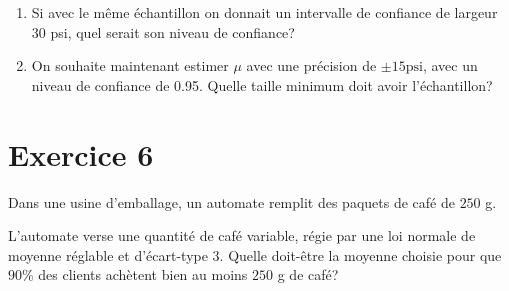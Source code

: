 \begin{enumerate}
{\begin{solution}
            Cet intervalle de confiance est plus large. Plus un intervalle est large, plus la probabilité de tomber à l'intérieur est grande.
            
        \end{solution}
    }{}
    \item Si avec le même échantillon on donnait un intervalle de confiance de largeur 30 psi, quel serait son niveau de confiance?

    \item On souhaite maintenant estimer $\mu$ avec une précision de $\pm 15 \mathrm{psi}$, avec un niveau de confiance de 0.95. Quelle taille minimum doit avoir l'échantillon?
\end{enumerate}

\vspace{0.8cm}

\section*{Exercice 6}
Dans une usine d'emballage, un automate remplit des paquets de café de $250$ g. 

L'automate verse une quantité de café variable, régie par une loi normale de moyenne réglable et d'écart-type $3$. 
Quelle doit-être la moyenne choisie pour que $90 \%$ des clients achètent bien au moins $250$ g de café?

